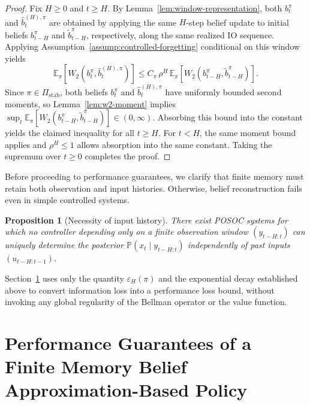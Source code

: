 \documentclass[letterpaper, 10 pt, conference]{ieeeconf}
\newtheorem{proposition}{Proposition}
\begin{document}
\begin{proof}
Fix $H\ge0$ and $t\ge H$.
By Lemma~\ref{lem:window-representation}, both $b_t^\pi$ and $\hat b_t^{(H),\pi}$ are obtained by applying the same $H$-step belief update to initial beliefs $b_{t-H}^\pi$ and $\tilde b_{t-H}^\pi$, respectively, along the same realized IO sequence.
Applying Assumption~\ref{assump:controlled-forgetting} conditional on this window yields
\begin{equation}
\mathbb{E}_\pi\!\left[
W_2\!\left(b_t^\pi,\hat b_t^{(H),\pi}\right)
\right]
\le
C_\pi\,\rho^H\,
\mathbb{E}_\pi\!\left[
W_2\!\left(b_{t-H}^\pi,\tilde b_{t-H}^\pi\right)
\right].
\end{equation}
Since $\pi\in\Pi_{\mathrm{stab}}$, both beliefs $b_t^\pi$ and $\hat b_t^{(H),\pi}$ have uniformly bounded second moments, so Lemma~\ref{lem:w2-moment} implies $\sup_t\mathbb{E}_\pi[W_2(b_{t-H}^\pi,\tilde b_{t-H}^\pi)]\in (0, \infty)$.
Absorbing this bound into the constant yields the claimed inequality for all $t\ge H$.
For $t<H$, the same moment bound applies and $\rho^H\le1$ allows absorption into the same constant.
Taking the supremum over $t\ge0$ completes the proof.
\end{proof}

Before proceeding to performance guarantees, we clarify that finite memory must retain both observation and input histories. Otherwise, belief reconstruction fails even in simple controlled systems.

\begin{proposition}[Necessity of input history]
\label{prop:input-necessity}
There exist POSOC systems for which no controller depending only on a finite observation window $(y_{t-H:t})$ can uniquely determine the posterior $\mathbb{P}(x_t\mid y_{t-H:t})$ independently of past inputs $(u_{t-H:t-1})$.
\end{proposition}

Section~\ref{sec:guarantees} uses only the quantity $\varepsilon_H(\pi)$ and the exponential decay established above to convert information loss into a performance loss bound, without invoking any global regularity of the Bellman operator or the value function.




\section{Performance Guarantees of a Finite Memory Belief Approximation-Based Policy}
\label{sec:guarantees}
\end{document}
